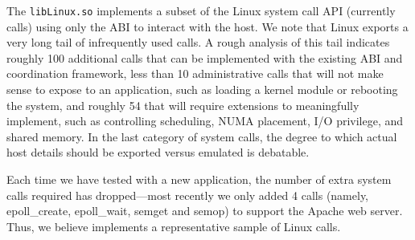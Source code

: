 


\vspace{5pt}
The \sysname{} {\tt libLinux.so} implements a subset 
of the Linux system call API (currently \syscalls{} calls)
using only the \pal{} ABI to interact with the host.
We note that Linux exports a very long tail of infrequently used calls.
A rough analysis of this tail indicates roughly 100 additional calls that can be implemented
with the existing \pal{} ABI and coordination framework, less than 10 administrative calls that will not make sense to expose to 
an application, such as loading a kernel module or rebooting the system, and roughly 54 that will require 
\pal{} extensions to meaningfully implement, such as controlling scheduling,
NUMA placement, I/O privilege, and shared memory.
In the last category of system calls, the degree to which actual host details should be exported versus emulated is debatable.

Each time we have tested \sysname{} with a new application, the number of extra system calls
required has dropped---most recently we only added 4 calls
(namely, epoll\_create, epoll\_wait, semget and semop)
to support the Apache web server.
Thus, we believe \sysname{} implements a representative sample of Linux calls.



